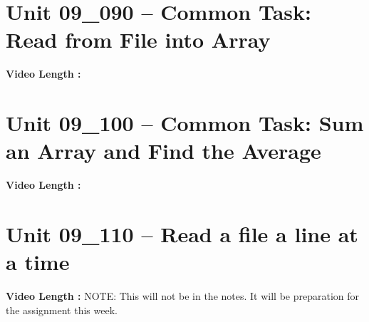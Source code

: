 \documentclass[letterpaper,12pt]{exam}
\newcommand{\unit}{Unit 09}
\begin{document}
\begin{questions}
\section*{\unit\_090 -- Common Task: Read from File into Array} 
\par{\selectfont\textbf{Video Length :}}
\section*{\unit\_100 -- Common Task: Sum an Array and Find the Average} 
\par{\selectfont\textbf{Video Length :}}
\section*{\unit\_110 -- Read a file a line at a time } 
\par{\selectfont\textbf{Video Length :}}
NOTE:  This will not be in the notes.  It will be preparation for the assignment this week.




\end{questions}
\end{document}
